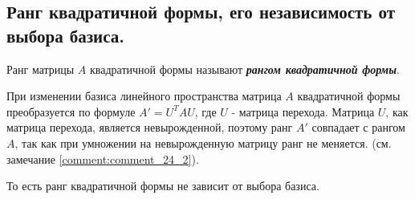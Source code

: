 \subsection{
    Ранг квадратичной формы, его независимость от выбора базиса.
}

\begin{definition}
    Ранг матрицы $A$ квадратичной формы называют \textbf{\textit{рангом квадратичной формы}}.
\end{definition}

При изменении базиса линейного пространства матрица $A$ квадратичной формы преобразуется по формуле $A' = U^TAU$, где $U$ - матрица перехода. Матрица $U$, как матрица перехода, является невырожденной, поэтому ранг $A'$ совпадает с рангом $A$, так как при умножении на невырожденную матрицу ранг не меняется. (см. замечание \ref{comment:comment_24_2}). 

То есть ранг квадратичной формы не зависит от выбора базиса.
